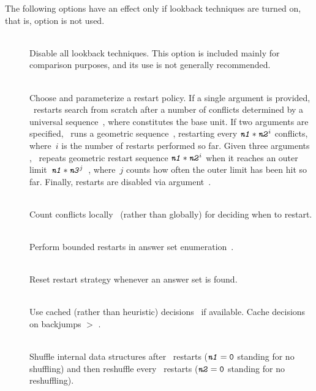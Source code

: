 The following options have an effect only if lookback techniques
are turned on, that is, option  is not used.
%
\begin{description}
\item[]~\\
Disable all lookback techniques.
This option is included mainly for comparison purposes, and its use
is not generally recommended.
\item[]~\\
Choose and parameterize a restart policy.
If a single argument  is provided,
\clasp\ restarts search from scratch after a number of conflicts
determined by a universal sequence~\cite{lusizu93a}, where 
constitutes the base unit.
If two arguments  are specified,
\clasp\ runs a geometric sequence~\cite{eensor03a},
restarting every $\texttt{\textit{n1}}*\texttt{\textit{n2}}^i$ conflicts,
where~$i$ is the number of restarts performed so far.
Given three arguments ,
\clasp\ repeats geometric restart sequence $\texttt{\textit{n1}}*\texttt{\textit{n2}}^i$
when it reaches an outer limit~$\texttt{\textit{n1}}*\texttt{\textit{n3}}^j$~\cite{biere08a},
where~$j$ counts how often the outer limit has been hit so far.
Finally, restarts are disabled via argument~.
\item[]~\\
Count conflicts locally~\cite{ryvstr08a} (rather than globally)
for deciding when to restart.
\item[]~\\
Perform bounded restarts in answer set enumeration~\cite{gekanesc07c}.
\item[]~\\
Reset restart strategy whenever an answer set is found.
\item[]~\\
Use cached (rather than heuristic) decisions~\cite{pipdar07a} if available.
Cache decisions on backjumps $>$ .
\item[]~\\
Shuffle internal data structures after~ restarts
($\texttt{\textit{n1}}=\texttt{0}$ standing for no shuffling)
and then reshuffle every~ restarts 
($\texttt{\textit{n2}}=\texttt{0}$ standing for no reshuffling).

\end{description}
